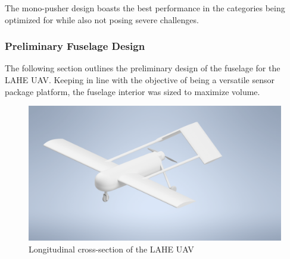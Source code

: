\documentclass[12pt]{article}
\begin{document}
	The mono-pusher design boasts the best performance in the categories being optimized for while also not posing severe challenges.
	
	\subsubsection{Preliminary Fuselage Design}
	The following section outlines the preliminary design of the fuselage for the LAHE UAV. Keeping in line with the objective of being a versatile sensor package platform, the fuselage interior was sized to maximize volume.
	\begin{figure}[h!]
		\centering
		\includegraphics[width=6 in]{Media/Drone.png} %
		\caption{Longitudinal cross-section of the LAHE UAV}
	\end{figure}
	
\end{document}
